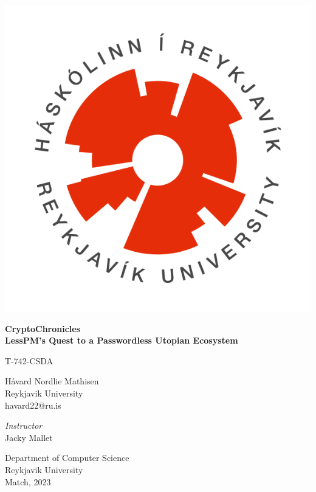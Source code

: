 \documentclass{article}
\title{\titleHeading}
\author{Håvard Nordlie Mathisen}
\date{January, 2023}
\newcommand{\jacky}{Jacky Mallet}
\newcommand{\secu}{T-742-CSDA}
\newcommand{\titleHeading}{CryptoChronicles}
\newcommand{\titleSubheading}{LessPM's Quest to a Passwordless Utopian Ecosystem}
\newcommand{\subjectName}{\secu}
\newcommand{\instructorName}{\jacky}
\begin{document}
    \begin{titlepage}
        \begin{center}
            \includegraphics[scale=0.4]{images/HR_logo_hringur_transparent}

            \huge
            \textbf{\titleHeading}\\
            \Large
            \textbf{\titleSubheading}

            \vspace{1cm}
            \large
            \subjectName

            \vspace{0.5cm}
            \Large
            Håvard Nordlie Mathisen\\
            \large
            Reykjavik University\\
            havard22@ru.is


            \vfill

            \normalsize
            \textit{Instructor}\\
            \instructorName

            \vspace{0.8cm}

            Department of Computer Science\\
            Reykjavik University\\
            Match, 2023\\

        \end{center}
    \end{titlepage}
\end{document}
